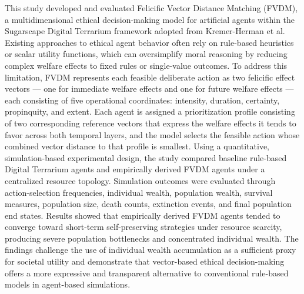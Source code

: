 \documentclass{icsthesis}
\begin{document}
\begin{frontmatter}
		\begin{abstractwithpageno}	
		\noindent
This study developed and evaluated Felicific Vector Distance Matching (FVDM), a multidimensional ethical decision-making model for artificial agents within the Sugarscape Digital Terrarium framework adopted from Kremer-Herman et al. Existing approaches to ethical agent behavior often rely on rule-based heuristics or scalar utility functions, which can oversimplify moral reasoning by reducing complex welfare effects to fixed rules or single-value outcomes. To address this limitation, FVDM represents each feasible deliberate action as two felicific effect vectors --- one for immediate welfare effects and one for future welfare effects --- each consisting of five operational coordinates: intensity, duration, certainty, propinquity, and extent. Each agent is assigned a prioritization profile consisting of two corresponding reference vectors that express the welfare effects it tends to favor across both temporal layers, and the model selects the feasible action whose combined vector distance to that profile is smallest. Using a quantitative, simulation-based experimental design, the study compared baseline rule-based Digital Terrarium agents and empirically derived FVDM agents under a centralized resource topology. Simulation outcomes were evaluated through action-selection frequencies, individual wealth, population wealth, survival measures, population size, death counts, extinction events, and final population end states. Results showed that empirically derived FVDM agents tended to converge toward short-term self-preserving strategies under resource scarcity, producing severe population bottlenecks and concentrated individual wealth. The findings challenge the use of individual wealth accumulation as a sufficient proxy for societal utility and demonstrate that vector-based ethical decision-making offers a more expressive and transparent alternative to conventional rule-based models in agent-based simulations.
		\end{abstractwithpageno}

	\end{frontmatter}
	
\end{document}
